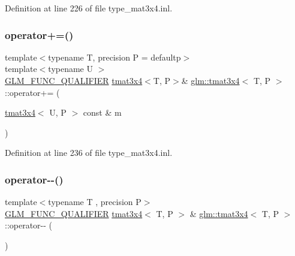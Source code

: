 Definition at line 226 of file type\+\_\+mat3x4.\+inl.

\mbox{\label{structglm_1_1tmat3x4_a67a241cb6158b5d52e8530ed74ed99cd}} 
\subsubsection{\texorpdfstring{operator+=()}{operator+=()}\hspace{0.1cm}{\footnotesize\ttfamily [4/4]}}
{\footnotesize\ttfamily template$<$typename T, precision P = defaultp$>$ \\
template$<$typename U $>$ \\
\mbox{\hyperlink{setup_8hpp_a33fdea6f91c5f834105f7415e2a64407}{G\+L\+M\+\_\+\+F\+U\+N\+C\+\_\+\+Q\+U\+A\+L\+I\+F\+I\+ER}} \mbox{\hyperlink{structglm_1_1tmat3x4}{tmat3x4}}$<$T, P$>$\& \mbox{\hyperlink{structglm_1_1tmat3x4}{glm\+::tmat3x4}}$<$ T, P $>$\+::operator+= (\begin{DoxyParamCaption}\item[{\mbox{\hyperlink{structglm_1_1tmat3x4}{tmat3x4}}$<$ U, P $>$ const \&}]{m }\end{DoxyParamCaption})}



Definition at line 236 of file type\+\_\+mat3x4.\+inl.

\mbox{\label{structglm_1_1tmat3x4_a5198a23b569931c189191afb025d46e2}} 
\subsubsection{\texorpdfstring{operator-\/-\/()}{operator--()}\hspace{0.1cm}{\footnotesize\ttfamily [1/2]}}
{\footnotesize\ttfamily template$<$typename T , precision P$>$ \\
\mbox{\hyperlink{setup_8hpp_a33fdea6f91c5f834105f7415e2a64407}{G\+L\+M\+\_\+\+F\+U\+N\+C\+\_\+\+Q\+U\+A\+L\+I\+F\+I\+ER}} \mbox{\hyperlink{structglm_1_1tmat3x4}{tmat3x4}}$<$ T, P $>$ \& \mbox{\hyperlink{structglm_1_1tmat3x4}{glm\+::tmat3x4}}$<$ T, P $>$\+::operator-\/-\/ (\begin{DoxyParamCaption}{ }\end{DoxyParamCaption})}



